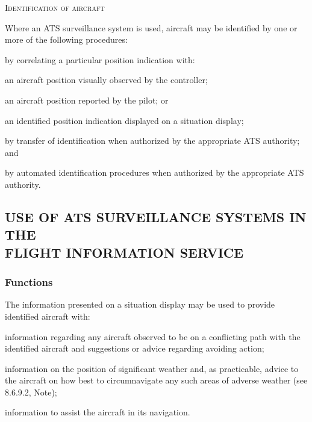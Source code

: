 \begin{enumeratesc}
    \item \textsc{Identification of aircraft}
    \begin{enumempty}
        \item Where an ATS surveillance system is used, aircraft may be identified by one or more of the following procedures:
    \end{enumempty}
    \begin{enumalph}
        \item by correlating a particular position indication with:     
        \begin{enumroman}
            \item an aircraft position visually observed by the controller;
            \item an aircraft position reported by the pilot; or
            \item an identified position indication displayed on a situation display;
        \end{enumroman}
        \item by transfer of identification when authorized by the appropriate ATS authority; and
        \item by automated identification procedures when authorized by the appropriate ATS authority.
    \end{enumalph}
\end{enumeratesc}

\subsection[Use of ATS surveillance systems in the flight information service]{USE OF ATS SURVEILLANCE SYSTEMS IN THE \\ FLIGHT INFORMATION SERVICE}


\subsubsection{Functions}

The information presented on a situation display may be used to provide identified aircraft with:
\begin{enumalph}
    \item information regarding any aircraft observed to be on a conflicting path with the identified aircraft and suggestions or advice regarding avoiding action;
    \item information on the position of significant weather and, as practicable, advice to the aircraft on how best to circumnavigate any such areas of adverse weather (see 8.6.9.2, Note);
    \item information to assist the aircraft in its navigation.
\end{enumalph}

\chapterend